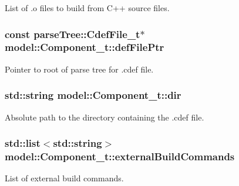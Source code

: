 List of .o files to build from C++ source files. 

\subsubsection[{\texorpdfstring{def\+File\+Ptr}{defFilePtr}}]{\setlength{\rightskip}{0pt plus 5cm}const {\bf parse\+Tree\+::\+Cdef\+File\+\_\+t}$\ast$ model\+::\+Component\+\_\+t\+::def\+File\+Ptr}\hypertarget{structmodel_1_1_component__t_a2c807d8e460fc0ca0e43c11563e12405}{}\label{structmodel_1_1_component__t_a2c807d8e460fc0ca0e43c11563e12405}


Pointer to root of parse tree for .cdef file. 

\subsubsection[{\texorpdfstring{dir}{dir}}]{\setlength{\rightskip}{0pt plus 5cm}std\+::string model\+::\+Component\+\_\+t\+::dir}\hypertarget{structmodel_1_1_component__t_a51d470c02bfb61e18526d8ebd6f5f565}{}\label{structmodel_1_1_component__t_a51d470c02bfb61e18526d8ebd6f5f565}


Absolute path to the directory containing the .cdef file. 

\subsubsection[{\texorpdfstring{external\+Build\+Commands}{externalBuildCommands}}]{\setlength{\rightskip}{0pt plus 5cm}std\+::list$<$std\+::string$>$ model\+::\+Component\+\_\+t\+::external\+Build\+Commands}\hypertarget{structmodel_1_1_component__t_a8024a14c66ae3392e4f702823bc264f3}{}\label{structmodel_1_1_component__t_a8024a14c66ae3392e4f702823bc264f3}


List of external build commands. 

